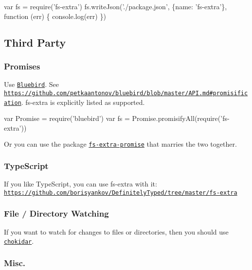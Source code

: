 \begin{DoxyCode}
var fs = require('fs-extra')
fs.writeJson('./package.json', \{name: 'fs-extra'\}, function (err) \{
  console.log(err)
\})
\end{DoxyCode}


\subsection*{Third Party }

\subsubsection*{Promises}

Use \href{https://github.com/petkaantonov/bluebird}{\tt Bluebird}. See \href{https://github.com/petkaantonov/bluebird/blob/master/API.md#promisification}{\tt https\+://github.\+com/petkaantonov/bluebird/blob/master/\+A\+P\+I.\+md\#promisification}. {\ttfamily fs-\/extra} is explicitly listed as supported.


\begin{DoxyCode}
var Promise = require('bluebird')
var fs = Promise.promisifyAll(require('fs-extra'))
\end{DoxyCode}


Or you can use the package \href{https://github.com/overlookmotel/fs-extra-promise}{\tt {\ttfamily fs-\/extra-\/promise}} that marries the two together.

\subsubsection*{Type\+Script}

If you like Type\+Script, you can use {\ttfamily fs-\/extra} with it\+: \href{https://github.com/borisyankov/DefinitelyTyped/tree/master/fs-extra}{\tt https\+://github.\+com/borisyankov/\+Definitely\+Typed/tree/master/fs-\/extra}

\subsubsection*{File / Directory Watching}

If you want to watch for changes to files or directories, then you should use \href{https://github.com/paulmillr/chokidar}{\tt chokidar}.

\subsubsection*{Misc.}


